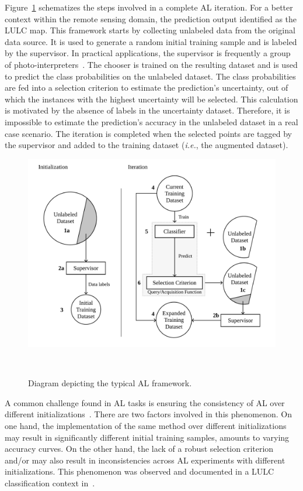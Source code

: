 \documentclass[remotesensing,article,submit,moreauthors,pdftex]{Definitions/mdpi}
\begin{document}
Figure~\ref{fig:al_typical} schematizes the steps involved in a complete AL
iteration. For a better context within the remote sensing domain, the
prediction output  identified as the LULC map. This
framework starts by collecting unlabeled data from the original data source.
It is used to generate a random initial training sample and is labeled by the
supervisor. In practical applications, the supervisor is frequently a group of
photo-interpreters~\cite{Kottke2017}. The chooser is trained on the resulting
dataset and is used to predict the class probabilities on the unlabeled
dataset. The class probabilities are fed into a selection criterion to
estimate the prediction's uncertainty, out of which the instances with the
highest uncertainty will be selected. This calculation is motivated by the
absence of labels in the uncertainty dataset. Therefore, it is impossible to
estimate the prediction's accuracy in the unlabeled dataset in a real case
scenario. The iteration is completed when the selected points are tagged by
the supervisor and added to the training dataset (\textit{i.e.}, the augmented
dataset). 

\begin{figure}[htb]
	\centering
	\includegraphics[width=\linewidth]{../analysis/al_typical}
	\caption{Diagram depicting the typical AL framework.
    }~\label{fig:al_typical}
\end{figure}

A common challenge found in AL tasks is ensuring the consistency of AL over
different initializations~\cite{Kottke2017}. There are two factors involved in
this phenomenon. On one hand, the implementation of the same method over
different initializations may result in significantly different initial
training samples, amounts to varying accuracy curves. On the other hand, the
lack of a robust selection criterion and/or  may
also result in inconsistencies across AL experiments with different
initializations. This phenomenon was observed and documented in a LULC
classification context in~\cite{tuia2011using}.
\end{document}
